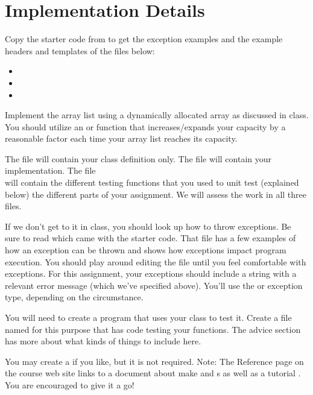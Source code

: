 \documentclass[11pt]{report}
\begin{document}
\section*{Implementation Details}
 Copy the starter code from  to get the exception examples and the example headers and templates of the files below:
 \begin{itemize}
     \item {}
     \item {}
     \item {}
 \end{itemize}

 Implement the array list using a dynamically allocated array as
    discussed in class.  You should utilize an  or 
    function that increases/expands your capacity by a reasonable factor
    each time your array list reaches its capacity.
    
    The file  will contain your class definition only.
    The file  will contain your implementation. The
    file\\  will contain the different testing
    functions that you used to unit test (explained below) the different
    parts of your assignment.  We will assess the work in all three files.

    If we don't get to it in class, you should look up how to throw
    exceptions.  Be sure to read  which came with the
    starter code.  That file has a few examples of how an exception can be
    thrown and shows how exceptions impact program execution.  You should
    play around editing the file until you feel comfortable with
    exceptions.  For this assignment, your exceptions should include a
    string with a relevant error message (which we've specified above).
    You'll use the  or  exception type, depending on the circumstance.
    
    You will need to create a program that uses your class to test it.
    Create a file named  for this purpose that has
    code testing your functions.  The advice section has more about what
    kinds of things to include here.

    You may create a  if you like, but it is not required.  Note:
    The Reference page on the course web site links to a document about
    make and  s as well as a tutorial  .  You are encouraged to give it a go!
    
\end{document}

